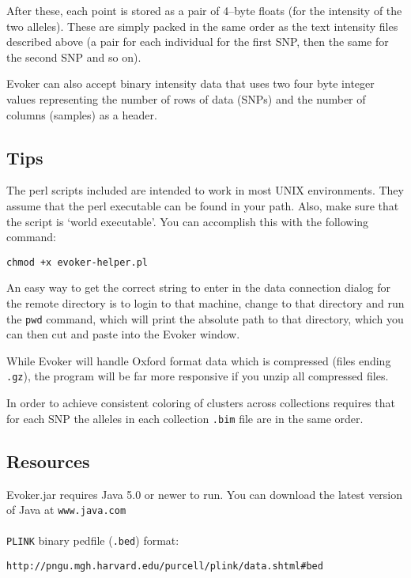 \documentclass{article}
\begin{document}
\noindent After these, each point is stored as a pair of 4--byte floats (for the intensity of the two alleles). These are simply packed in the same order as the text intensity files described above (a pair for each individual for the first SNP, then the same for the second SNP and so on).

Evoker can also accept binary intensity data that uses two four byte integer values representing the number of rows of data (SNPs) and the number of columns (samples) as a header.

\subsection{Tips}

The perl scripts included are intended to work in most UNIX environments. They assume that the perl executable can be found in your path.  Also, make sure that the script is `world executable'. You can accomplish this with the following command: 

\begin{verbatim}
chmod +x evoker-helper.pl
\end{verbatim}

\noindent An easy way to get the correct string to enter in the data connection dialog for the remote directory is to login to that machine, change to that directory and run the \texttt{pwd} command, which will print the absolute path to that directory, which you can then cut and paste into the Evoker window.

\noindent While Evoker will handle Oxford format data which is compressed (files ending \texttt{.gz}), the program will be far more responsive if you unzip all compressed files.

\noindent In order to achieve consistent coloring of clusters across collections requires that for each SNP the alleles in each collection \texttt{.bim} file are in the same order.

\subsection{Resources}
Evoker.jar requires Java 5.0 or newer to run. You can download the latest version of Java at \texttt{www.java.com}
\\
\\
\texttt{PLINK} binary pedfile (\texttt{.bed}) format:  

\indent \texttt{http://pngu.mgh.harvard.edu/purcell/plink/data.shtml\#bed}
\end{document}
